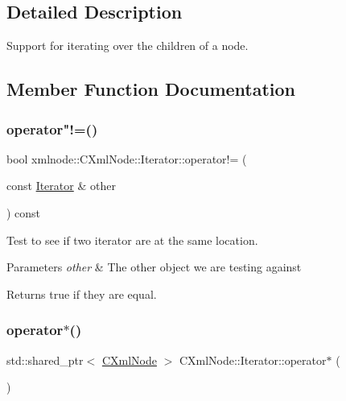 \subsection{Detailed Description}
Support for iterating over the children of a node. 

\subsection{Member Function Documentation}
\mbox{\label{classxmlnode_1_1_c_xml_node_1_1_iterator_a55c86e64262a6ef16e253f2aef70578c}} 
\subsubsection{\texorpdfstring{operator"!=()}{operator!=()}}
{\footnotesize\ttfamily bool xmlnode\+::\+C\+Xml\+Node\+::\+Iterator\+::operator!= (\begin{DoxyParamCaption}\item[{const \mbox{\hyperlink{classxmlnode_1_1_c_xml_node_1_1_iterator}{Iterator}} \&}]{other }\end{DoxyParamCaption}) const\hspace{0.3cm}{\ttfamily [inline]}}



Test to see if two iterator are at the same location. 


\begin{DoxyParams}{Parameters}
{\em other} & The other object we are testing against \\
\hline
\end{DoxyParams}
\begin{DoxyReturn}{Returns}
true if they are equal. 
\end{DoxyReturn}
\mbox{\label{classxmlnode_1_1_c_xml_node_1_1_iterator_a6d255a513c60c7de55a01c5eb626bf6d}} 
\subsubsection{\texorpdfstring{operator$\ast$()}{operator*()}}
{\footnotesize\ttfamily std\+::shared\+\_\+ptr$<$ \mbox{\hyperlink{classxmlnode_1_1_c_xml_node}{C\+Xml\+Node}} $>$ C\+Xml\+Node\+::\+Iterator\+::operator$\ast$ (\begin{DoxyParamCaption}{ }\end{DoxyParamCaption})}



